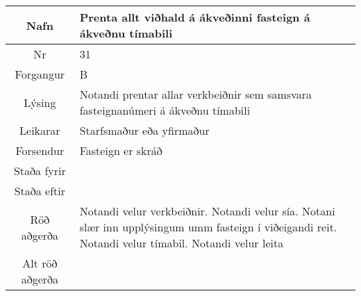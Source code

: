 \documentclass[a4paper]{article}
\begin{document}
\begin{tabular}{|c|p{10cm}|}
\hline
Nafn&Prenta allt viðhald á ákveðinni fasteign á ákveðnu tímabili\\
\hline
Nr&31\\
\hline
Forgangur&B\\
\hline
Lýsing&Notandi prentar allar verkbeiðnir sem samsvara fasteignanúmeri á ákveðnu tímabili\\
\hline
Leikarar&Starfsmaður eða yfirmaður\\
\hline
Forsendur&Fasteign er skráð\\
\hline
Staða fyrir&\\
\hline
Staða eftir&\\
\hline
Röð aðgerða&Notandi velur verkbeiðnir. Notandi velur sía. Notani slær inn upplýsingum umm fasteign í viðeigandi reit. Notandi velur tímabil. Notandi velur leita\\
\hline
Alt röð aðgerða&\\
\hline
\end{tabular}
\end{document}

